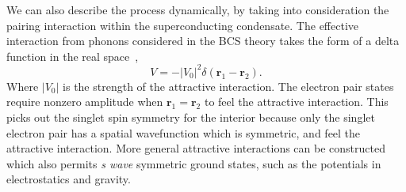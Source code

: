 \documentclass[10pt,letterpaper,aps,onecolumn,superscriptaddress,floatfix,notitlepage]{revtex4-1}
\begin{document}
	We can also describe the process dynamically, by taking into consideration the pairing interaction within the superconducting condensate. The effective interaction from phonons considered in the BCS theory takes the form of a delta function in the real space~\cite{annett2004superconductivity},
	\begin{equation}
	V = -|V_{0}|^{2}\delta(\textbf{r}_{1}-\textbf{r}_{2}).
	\end{equation}
	Where $|V_{0}|$ is the strength of the attractive interaction.	The electron pair states require nonzero amplitude when $\textbf{r}_{1}=\textbf{r}_{2}$ to feel the attractive interaction. This picks out the singlet spin symmetry for the interior because only the singlet electron pair has a spatial wavefunction which is symmetric, and feel the attractive interaction. More general attractive interactions can be constructed which also permits \textit{s wave} symmetric ground states, such as the potentials in electrostatics and gravity.
	
\end{document}

